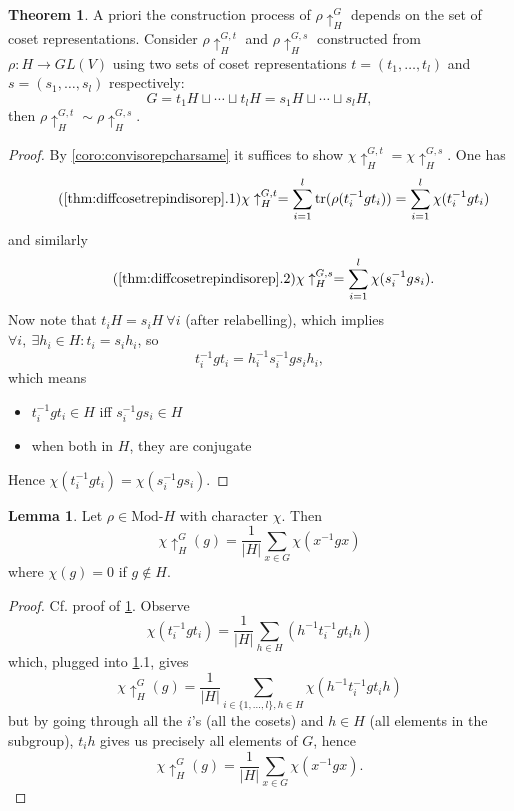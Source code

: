 \documentclass{article}
\newcommand{\tr}{\text{tr}}
\newcommand{\Mod}{\text{Mod-}}
\theoremstyle{definition}
\newtheorem{thm}[defn]{Theorem}
\newtheorem{lemma}[defn]{Lemma}
\begin{document}
\begin{thm}
\label{thm:diffcosetrepindisorep}
A priori the construction process of $\rho\uparrow_H^G$ depends on the set of coset representations. Consider $\rho\uparrow_H^{G,t}$ and $\rho\uparrow_H^{G,s}$ constructed from $\rho:H\rightarrow GL(V)$ using two sets of coset representations $t=(t_1,\ldots,t_l)$ and $s=(s_1,\ldots,s_l)$ respectively:
\[
G=t_1 H\sqcup\cdots\sqcup t_lH=s_1 H\sqcup\cdots\sqcup s_lH,
\]
then $\rho\uparrow_H^{G,t}\sim\rho\uparrow_H^{G,s}$.
\end{thm}
\begin{proof}
By \ref{coro:convisorepcharsame} it suffices to show $\chi\uparrow_H^{G,t}=\chi\uparrow_H^{G,s}$. One has
\[
\tag{\ref{thm:diffcosetrepindisorep}.1}
\chi\uparrow_H^{G,t}=\sum_{i=1}^l \tr(\rho(t_i^{-1}gt_i))=\sum_{i=1}^l \chi(t_i^{-1}gt_i)
\]
and similarly
\[
\tag{\ref{thm:diffcosetrepindisorep}.2}
\chi\uparrow_H^{G,s}=\sum_{i=1}^l \chi(s_i^{-1}gs_i).
\]
Now note that $t_iH=s_iH \ \forall i$ (after relabelling), which implies $\forall i,\ \exists h_i\in H:t_i=s_ih_i$, so
\[
t_i^{-1}gt_i=h_i^{-1}s_i^{-1}gs_ih_i,
\]
which means
\begin{itemize}
\item $t_i^{-1}gt_i\in H$ iff $s_i^{-1}gs_i\in H$
\item when both in $H$, they are conjugate
\end{itemize}
Hence $\chi(t_i^{-1}gt_i)=\chi(s_i^{-1}gs_i)$.
\end{proof}

\begin{lemma}
\label{lemma:formulaforcharofindrep}
Let $\rho\in\Mod H$ with character $\chi$. Then
\[
\chi\uparrow_H^G(g)=\frac{1}{|H|}\sum_{x\in G}\chi(x^{-1}gx)
\]
where $\chi(g)=0$ if $g\notin H$.
\end{lemma}
\begin{proof}
Cf. proof of \ref{thm:diffcosetrepindisorep}. Observe
\[
\chi(t_i^{-1}gt_i)=\frac{1}{|H|}\sum_{h\in H}(h^{-1}t_i^{-1}gt_ih)
\]
which, plugged into \ref{thm:diffcosetrepindisorep}.1, gives
\[
\chi\uparrow_H^G(g)=\frac{1}{|H|}\sum_{i\in\{1,\ldots,l\},h\in H}\chi(h^{-1}t_i^{-1}gt_ih)
\]
but by going through all the $i$'s (all the cosets) and $h\in H$ (all elements in the subgroup), $t_ih$ gives us precisely all elements of $G$, hence
\[
\chi\uparrow_H^G(g)=\frac{1}{|H|}\sum_{x\in G}\chi(x^{-1}gx).
\]
\end{proof}
\end{document}
